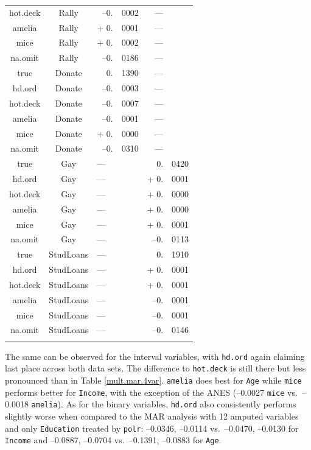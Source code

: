 \documentclass[12pt,econ]{sources/authesis}
\begin{document}
\begin{longtable}{ccr@{}lr@{}l}
 hot.deck & Rally & --0.&0002 & --- \\
 amelia & Rally & + 0.&0001 & --- \\ 
 mice & Rally & + 0.&0002 & --- \\
 na.omit & Rally & --0.&0186 & --- \\ 
 true & Donate & 0.&1390 & --- \\ 
 hd.ord & Donate & --0.&0003 & --- \\ 
 hot.deck & Donate & --0.&0007 & --- \\
 amelia & Donate & --0.&0001 & --- \\
 mice & Donate & + 0.&0000 & --- \\ 
 na.omit & Donate & --0.&0310 & --- \\ 
 true & Gay & \multicolumn{2}{l}{---} & 0.&0420 \\ 
 hd.ord & Gay & \multicolumn{2}{l}{---} & + 0.&0001 \\ 
 hot.deck & Gay & \multicolumn{2}{l}{---} & + 0.&0000 \\ 
 amelia & Gay & \multicolumn{2}{l}{---} & + 0.&0000 \\ 
 mice & Gay & \multicolumn{2}{l}{---} & + 0.&0001 \\
 na.omit & Gay & \multicolumn{2}{l}{---} & --0.&0113 \\ 
 true & StudLoans & \multicolumn{2}{l}{---} & 0.&1910 \\
 hd.ord & StudLoans & \multicolumn{2}{l}{---} & + 0.&0001 \\ 
 hot.deck & StudLoans & \multicolumn{2}{l}{---} & + 0.&0001 \\
 amelia & StudLoans & \multicolumn{2}{l}{---} & --0.&0001 \\ 
 mice & StudLoans & \multicolumn{2}{l}{---} & --0.&0001 \\ 
 na.omit & StudLoans & \multicolumn{2}{l}{---} & --0.&0146 \\
 \hline \\[-1.8ex] 
 \end{longtable}
\dsp

\normalsize

The same can be observed for the interval variables, with \texttt{hd.ord} again claiming last place across both data sets. The difference to \texttt{hot.deck} is still there but less pronounced than in Table \ref{mult.mar.4var}. \texttt{amelia} does best for \texttt{Age} while \texttt{mice} performs better for \texttt{Income}, with the exception of the ANES (--0.0027 \texttt{mice} vs.~--0.0018 \texttt{amelia}). As for the binary variables, \texttt{hd.ord} also consistently performs slightly worse when compared to the MAR analysis with 12 amputed variables and only \texttt{Education} treated by \texttt{polr}: --0.0346, --0.0114 vs.~--0.0470, --0.0130 for \texttt{Income} and --0.0887, --0.0704 vs.~--0.1391, --0.0883 for \texttt{Age}.
\end{document}
